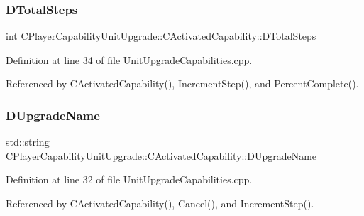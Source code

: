 \hypertarget{classCPlayerCapabilityUnitUpgrade_1_1CActivatedCapability_a56d9f9fd76c8757955e84ae8f56d5337}{}\label{classCPlayerCapabilityUnitUpgrade_1_1CActivatedCapability_a56d9f9fd76c8757955e84ae8f56d5337} 
\subsubsection{\texorpdfstring{D\+Total\+Steps}{DTotalSteps}}
{\footnotesize\ttfamily int C\+Player\+Capability\+Unit\+Upgrade\+::\+C\+Activated\+Capability\+::\+D\+Total\+Steps\hspace{0.3cm}{\ttfamily [protected]}}



Definition at line 34 of file Unit\+Upgrade\+Capabilities.\+cpp.



Referenced by C\+Activated\+Capability(), Increment\+Step(), and Percent\+Complete().

\hypertarget{classCPlayerCapabilityUnitUpgrade_1_1CActivatedCapability_acb0261591d692393b3c864d75edc799f}{}\label{classCPlayerCapabilityUnitUpgrade_1_1CActivatedCapability_acb0261591d692393b3c864d75edc799f} 
\subsubsection{\texorpdfstring{D\+Upgrade\+Name}{DUpgradeName}}
{\footnotesize\ttfamily std\+::string C\+Player\+Capability\+Unit\+Upgrade\+::\+C\+Activated\+Capability\+::\+D\+Upgrade\+Name\hspace{0.3cm}{\ttfamily [protected]}}



Definition at line 32 of file Unit\+Upgrade\+Capabilities.\+cpp.



Referenced by C\+Activated\+Capability(), Cancel(), and Increment\+Step().

